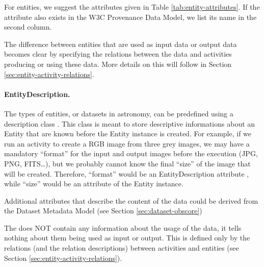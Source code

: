 For entities, we suggest the attributes given in Table 
\ref{tab:entity-attributes}. If the attribute also exists in the W3C 
Provenance Data Model, we list its name in the second column.



The difference between entities that are used as input data or output data 
becomes clear by specifying the relations between the data and activities producing or using these data.
More details on this will follow in Section \ref{sec:entity-activity-relations}.

\paragraph{EntityDescription.}
The types of entities, or datasets in astronomy, can be predefined using a description class .
This class is meant to store descriptive informations about an Entity that are known before the Entity instance is created. For example, if we run an activity to create a RGB image from three grey images, we may have a mandatory ``format'' for the input and output images before the execution (JPG, PNG, FITS\dots), but we probably cannot know the final ``size'' of the image  that will be created. Therefore, ``format'' would be an EntityDescription attribute , while ``size'' would be an attribute of the Entity instance. 

Additional attributes that describe the content of the data could be derived from 
the Dataset Metadata Model (see Section \ref{sec:dataset-obscore})

The  does NOT contain any information about the usage 
of the data, it tells nothing about them being used as input or output. This is 
defined only by the relations (and the relation descriptions) between activities
and entities (see Section \ref{sec:entity-activity-relations}).

